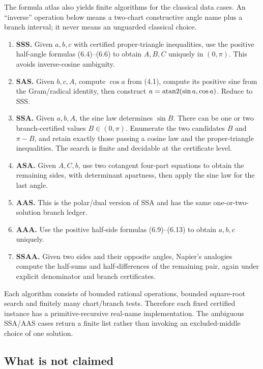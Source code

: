 The formula atlas also yields finite algorithms for the classical data cases.
An ``inverse'' operation below means a two-chart constructive angle name plus a
branch interval; it never means an unguarded classical choice.

\begin{enumerate}[label=\textup{Case \arabic*.}]
\item \textbf{SSS.}  Given \(a,b,c\) with certified proper-triangle
inequalities, use the positive half-angle formulas (6.4)--(6.6) to obtain
\(A,B,C\) uniquely in \((0,\pi)\).  This avoids inverse-cosine ambiguity.
\item \textbf{SAS.}  Given \(b,c,A\), compute \(\cos a\) from (4.1), compute
its positive sine from the Gram/radical identity, then construct
\(a=\operatorname{atan2}(\sin a,\cos a)\).  Reduce to SSS.
\item \textbf{SSA.}  Given \(a,b,A\), the sine law determines \(\sin B\).
There can be one or two branch-certified values \(B\in(0,\pi)\).  Enumerate the
two candidates \(B\) and \(\pi-B\), and retain exactly those passing a cosine
law and the proper-triangle inequalities.  The search is finite and decidable
at the certificate level.
\item \textbf{ASA.}  Given \(A,C,b\), use two cotangent four-part equations to
obtain the remaining sides, with determinant apartness, then apply the sine
law for the last angle.
\item \textbf{AAS.}  This is the polar/dual version of SSA and has the same
one-or-two-solution branch ledger.
\item \textbf{AAA.}  Use the positive half-side formulas (6.9)--(6.13) to
obtain \(a,b,c\) uniquely.
\item \textbf{SSAA.}  Given two sides and their opposite angles, Napier's
analogies compute the half-sums and half-differences of the remaining pair,
again under explicit denominator and branch certificates.
\end{enumerate}

Each algorithm consists of bounded rational operations, bounded square-root
search and finitely many chart/branch tests.  Therefore each fixed certified
instance has a primitive-recursive real-name implementation.  The ambiguous
SSA/AAS cases return a finite list rather than invoking an excluded-middle
choice of one solution.

\subsection{What is not claimed}

